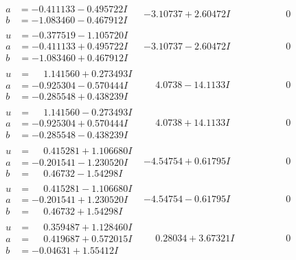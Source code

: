 \documentclass[1p]{elsarticle_modified}
\theoremstyle{definition}
\begin{document}
$$\begin{array}{c|c|c}
\begin{aligned}
a &= -0.411133 - 0.495722 I \\
b &= -1.083460 - 0.467912 I\end{aligned}
 & -3.10737 + 2.60472 I & \phantom{-0.000000 } 0 \\ \hline\begin{aligned}
u &= -0.377519 - 1.105720 I \\
a &= -0.411133 + 0.495722 I \\
b &= -1.083460 + 0.467912 I\end{aligned}
 & -3.10737 - 2.60472 I & \phantom{-0.000000 } 0 \\ \hline\begin{aligned}
u &= \phantom{-}1.141560 + 0.273493 I \\
a &= -0.925304 - 0.570444 I \\
b &= -0.285548 + 0.438239 I\end{aligned}
 & \phantom{-}4.0738 - 14.1133 I & \phantom{-0.000000 } 0 \\ \hline\begin{aligned}
u &= \phantom{-}1.141560 - 0.273493 I \\
a &= -0.925304 + 0.570444 I \\
b &= -0.285548 - 0.438239 I\end{aligned}
 & \phantom{-}4.0738 + 14.1133 I & \phantom{-0.000000 } 0 \\ \hline\begin{aligned}
u &= \phantom{-}0.415281 + 1.106680 I \\
a &= -0.201541 - 1.230520 I \\
b &= \phantom{-}0.46732 - 1.54298 I\end{aligned}
 & -4.54754 + 0.61795 I & \phantom{-0.000000 } 0 \\ \hline\begin{aligned}
u &= \phantom{-}0.415281 - 1.106680 I \\
a &= -0.201541 + 1.230520 I \\
b &= \phantom{-}0.46732 + 1.54298 I\end{aligned}
 & -4.54754 - 0.61795 I & \phantom{-0.000000 } 0 \\ \hline\begin{aligned}
u &= \phantom{-}0.359487 + 1.128460 I \\
a &= \phantom{-}0.419687 + 0.572015 I \\
b &= -0.04631 + 1.55412 I\end{aligned}
 & \phantom{-}0.28034 + 3.67321 I & \phantom{-0.000000 } 0 \\ \hline\begin{aligned}

\end{aligned}
\end{array}$$
\end{document}
